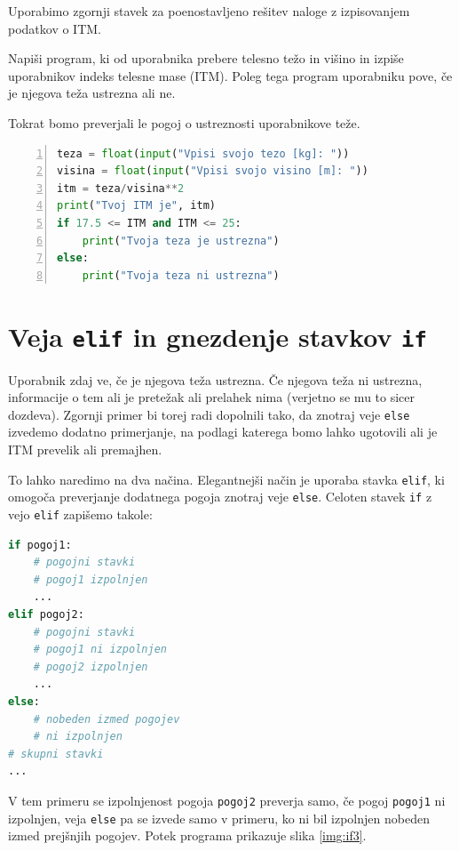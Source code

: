 Uporabimo zgornji stavek za poenostavljeno rešitev naloge z izpisovanjem podatkov o ITM.
\begin{zgled}
Napiši program, ki od uporabnika prebere telesno težo in višino in izpiše uporabnikov indeks telesne mase (ITM). Poleg tega program uporabniku pove, če je njegova teža ustrezna ali ne. 
\end{zgled}
\begin{resitev}
Tokrat bomo preverjali le pogoj o ustreznosti uporabnikove teže. 
\begin{lstlisting}[language=Python,numbers=left]
teza = float(input("Vpisi svojo tezo [kg]: "))
visina = float(input("Vpisi svojo visino [m]: "))
itm = teza/visina**2
print("Tvoj ITM je", itm)
if 17.5 <= ITM and ITM <= 25:
    print("Tvoja teza je ustrezna")
else:
    print("Tvoja teza ni ustrezna")
\end{lstlisting}
\end{resitev}

\section{Veja \texttt{elif} in gnezdenje stavkov \texttt{if}}

Uporabnik zdaj ve, če je njegova teža ustrezna. Če njegova teža ni ustrezna, informacije o tem ali je pretežak ali prelahek nima (verjetno se mu to sicer dozdeva). Zgornji primer bi torej radi dopolnili tako, da znotraj veje \texttt{else} izvedemo dodatno primerjanje, na podlagi katerega bomo lahko ugotovili ali je ITM prevelik ali premajhen.

To lahko naredimo na dva načina. Elegantnejši način je uporaba stavka \texttt{elif}, ki omogoča preverjanje dodatnega pogoja znotraj veje \texttt{else}. Celoten stavek \texttt{if} z vejo \texttt{elif} zapišemo takole:
\begin{lstlisting}[language=Python]
if pogoj1:
    # pogojni stavki
    # pogoj1 izpolnjen
    ...
elif pogoj2:
    # pogojni stavki
    # pogoj1 ni izpolnjen
    # pogoj2 izpolnjen
    ...
else:
    # nobeden izmed pogojev
    # ni izpolnjen
# skupni stavki
...
\end{lstlisting}
V tem primeru se izpolnjenost pogoja \texttt{pogoj2} preverja samo, če pogoj \texttt{pogoj1} ni izpolnjen, veja \texttt{else} pa se izvede samo v primeru, ko ni bil izpolnjen nobeden izmed prejšnjih pogojev. Potek programa prikazuje slika \ref{img:if3}.

